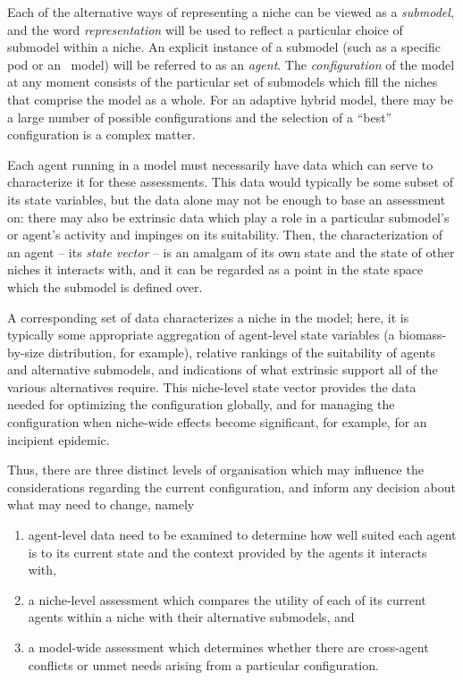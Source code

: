 Each of the alternative ways of representing a niche can be viewed as
a \emph{sub\-model}, and the word \emph{rep\-re\-sen\-ta\-tion} will
be used to reflect a particular choice of sub\-model within a niche.
An explicit instance of a sub\-model (such as a specific pod or an
\SD\ model) will be referred to as an \emph{agent}.  The
\emph{con\-fig\-ur\-a\-tion} of the model at any moment consists of
the particular set of sub\-models which fill the niches that comprise
the model as a whole. For an adaptive hybrid model, there may be a
large number of possible con\-fig\-ur\-a\-tions and the selection of a
``best'' con\-fig\-ur\-a\-tion is a complex matter.

Each agent running in a model must necessarily have data which can
serve to characterize it for these assessments. This data would
typically be some subset of its state variables, but the data alone
may not be enough to base an assessment on: there may also be
extrinsic data which play a role in a particular sub\-model's or agent's
activity and impinges on its suitability. Then, the characterization
of an agent -- its \emph{state vector} -- is an amalgam of its own
state and the state of other niches it interacts with, and it can be
regarded as a point in the state space which the sub\-model is defined
over. 

A corresponding set of data characterizes a niche in the model; here,
it is typically some appropriate aggregation of agent-level state
variables (a biomass-by-size distribution, for example), relative
rankings of the suitability of agents and alternative sub\-models, and
indications of what extrinsic support all of the various alternatives
require. This niche-level state vector provides the data needed for
optimizing the con\-fig\-ur\-a\-tion globally,
and for managing the con\-fig\-ur\-a\-tion when niche-wide effects
become significant, for example, for an incipient epidemic.

Thus, there are three distinct levels of organisation which may
influence the considerations regarding the current configur\-ation, and
inform any decision about what may need to change, namely
\begin{enumerate}
\item agent-level data need to be examined to determine how well
  suited each agent is to its current state and the context provided
  by the agents it interacts with,
\item a niche-level assessment which compares the utility of each of
  its current agents within a niche with their alternative sub\-models,
  and
\item a model-wide assessment which determines whether there are
  cross-agent conflicts or unmet needs arising from a particular
  con\-fig\-ur\-a\-tion.
\end{enumerate}

